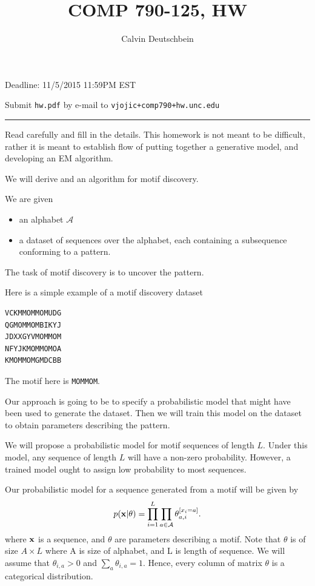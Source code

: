 \documentclass{article}
\begin{document}
\author{Calvin Deutschbein}
\setcounter{HW}{2}
\title{COMP  790-125, HW\theHW}
\maketitle


{ Deadline: 11/5/2015 11:59PM EST}

{ Submit \texttt{hw\theHW.pdf} by e-mail to \texttt{vjojic+comp790+hw\theHW@cs.unc.edu}



\noindent\rule{\textwidth}{3pt}

Read carefully and fill in the details. This homework is not meant to be difficult, rather it is meant
to establish flow of putting together a generative model, and developing an EM algorithm.


We will derive and an algorithm for motif discovery. 

We are given
\begin{itemize}
\item an alphabet $\mathcal{A}$
\item a dataset of sequences over the alphabet, each containing a subsequence conforming to a pattern.
\end{itemize}
The task of motif discovery is to uncover the pattern.


Here is a simple example of a motif discovery dataset
\begin{verbatim}
VCKMMOMMOMUDG
QGMOMMOMBIKYJ
JDXXGYVMOMMOM
NFYJKMOMMOMOA
KMOMMOMGMDCBB
\end{verbatim}
The motif here is \verb|MOMMOM|.

\vskip 5pt

Our approach is going to be to specify a probabilistic model that might have been used
to generate the dataset. Then we will train this model on the dataset to obtain parameters
describing the pattern. 


\newproblem{2pt}
We will propose a probabilistic model for motif sequences of length $L$.
Under this model, any sequence of length $L$ will have a non-zero probability.
However, a trained model ought to assign low probability to most sequences.

Our probabilistic model for a sequence generated from a motif will be given by
\[
p(\mathbf{x}|\theta) = \prod_{i=1}^L\prod_{a \in \mathcal{A}} \theta_{a,i}^{[x_i = a]}.
\]
where $\mathbf{x}$ is a sequence, and $\theta$ are parameters describing a motif.
Note that $\theta$ is of size $A \times L$ where A is size of alphabet, and L is length of sequence.
We will assume that $\theta_{i,a} > 0$ and $\sum_a \theta_{i,a} = 1$. Hence, every column
of matrix $\theta$ is a categorical distribution.

}
\end{document}
